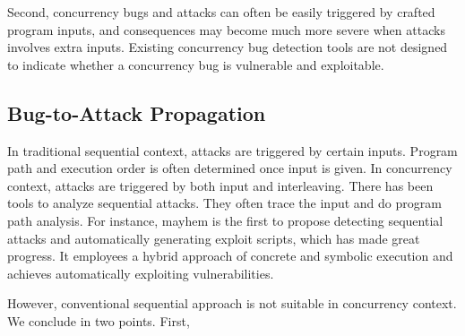 Second, concurrency bugs and attacks can often be easily
triggered by crafted program inputs, and consequences may 
become much more severe when attacks involves extra inputs.  
Existing concurrency bug detection tools are not designed to indicate 
whether a concurrency bug is vulnerable and exploitable.


\subsection{Bug-to-Attack Propagation}

In traditional sequential context, attacks are triggered by certain inputs. 
Program path and execution order is often 
determined once input is given. 
In concurrency context, attacks are triggered by both input and interleaving\cite{con-bugs,con:hotpar12}. 
There has been tools to analyze sequential attacks. 
They often trace the input and do program path analysis. 
For instance, mayhem\cite{mayhem:cmu} is the first to propose detecting 
sequential attacks and automatically generating exploit scripts, which has made great progress. 
It employees a hybrid 
approach of concrete and symbolic execution and achieves automatically 
exploiting vulnerabilities. 

However, conventional sequential approach is not suitable in concurrency context. 
We conclude in two points. First,  




